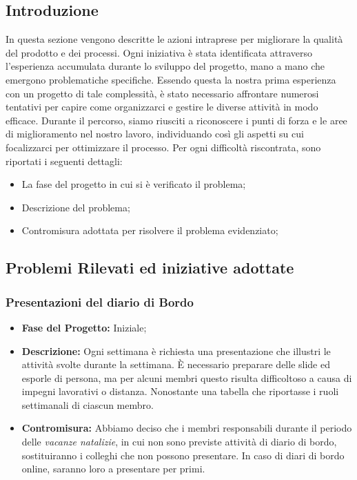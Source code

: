 \documentclass{article}
\begin{document}
\subsection{Introduzione}
In questa sezione vengono descritte le azioni intraprese per migliorare la qualità del prodotto e dei processi. 
Ogni iniziativa è stata identificata attraverso l’esperienza accumulata durante lo sviluppo del progetto, mano a mano che emergono problematiche specifiche. 
Essendo questa la nostra prima esperienza con un progetto di tale complessità, è stato necessario affrontare numerosi tentativi per capire come organizzarci e gestire le diverse attività in modo efficace. 
Durante il percorso, siamo riusciti a riconoscere i punti di forza e le aree di miglioramento nel nostro lavoro, individuando così gli aspetti su cui focalizzarci per ottimizzare il processo. 
Per ogni difficoltà riscontrata, sono riportati i seguenti dettagli:
\begin{itemize}
    \item La fase del progetto in cui si è verificato il problema;
    \item Descrizione del problema;
    \item Contromisura adottata per risolvere il problema evidenziato;
\end{itemize}

\subsection{Problemi Rilevati ed iniziative adottate}
\subsubsection{Presentazioni del diario di Bordo}
\begin{itemize}
    \item \textbf{Fase del Progetto:} Iniziale;
    \item \textbf{Descrizione:} Ogni settimana è richiesta una presentazione che illustri le attività svolte durante la settimana. È necessario preparare delle slide ed esporle di persona, ma per alcuni membri questo risulta difficoltoso a causa di impegni lavorativi o distanza. Nonostante una tabella che riportasse i ruoli settimanali di ciascun membro.
    \item \textbf{Contromisura:} Abbiamo deciso che i membri responsabili durante il periodo delle \textit{vacanze natalizie}, in cui non sono previste attività di diario di bordo, sostituiranno i colleghi che non possono presentare. In caso di diari di bordo online, saranno loro a presentare per primi.
\end{itemize}
\end{document}
